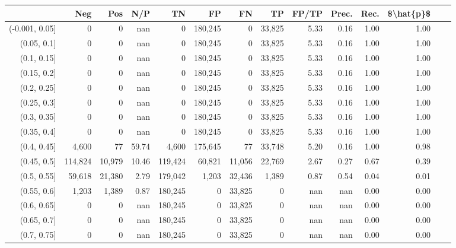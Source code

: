 \begin{tabular}{rrrrrrrrrrrrrr}
\toprule
{} &      Neg &     Pos &    N/P &       TN &       FP &      FN &      TP & FP/TP & Prec. &  Rec. & \$\textbackslash hat\{p\}\$ \\
\midrule
(-0.001, 0.05] &        0 &       0 &    nan &        0 &  180,245 &       0 &  33,825 &  5.33 &  0.16 &  1.00 &      1.00 \\
(0.05, 0.1]    &        0 &       0 &    nan &        0 &  180,245 &       0 &  33,825 &  5.33 &  0.16 &  1.00 &      1.00 \\
(0.1, 0.15]    &        0 &       0 &    nan &        0 &  180,245 &       0 &  33,825 &  5.33 &  0.16 &  1.00 &      1.00 \\
(0.15, 0.2]    &        0 &       0 &    nan &        0 &  180,245 &       0 &  33,825 &  5.33 &  0.16 &  1.00 &      1.00 \\
(0.2, 0.25]    &        0 &       0 &    nan &        0 &  180,245 &       0 &  33,825 &  5.33 &  0.16 &  1.00 &      1.00 \\
(0.25, 0.3]    &        0 &       0 &    nan &        0 &  180,245 &       0 &  33,825 &  5.33 &  0.16 &  1.00 &      1.00 \\
(0.3, 0.35]    &        0 &       0 &    nan &        0 &  180,245 &       0 &  33,825 &  5.33 &  0.16 &  1.00 &      1.00 \\
(0.35, 0.4]    &        0 &       0 &    nan &        0 &  180,245 &       0 &  33,825 &  5.33 &  0.16 &  1.00 &      1.00 \\
(0.4, 0.45]    &    4,600 &      77 &  59.74 &    4,600 &  175,645 &      77 &  33,748 &  5.20 &  0.16 &  1.00 &      0.98 \\
(0.45, 0.5]    &  114,824 &  10,979 &  10.46 &  119,424 &   60,821 &  11,056 &  22,769 &  2.67 &  0.27 &  0.67 &      0.39 \\
(0.5, 0.55]    &   59,618 &  21,380 &   2.79 &  179,042 &    1,203 &  32,436 &   1,389 &  0.87 &  0.54 &  0.04 &      0.01 \\
(0.55, 0.6]    &    1,203 &   1,389 &   0.87 &  180,245 &        0 &  33,825 &       0 &   nan &   nan &  0.00 &      0.00 \\
(0.6, 0.65]    &        0 &       0 &    nan &  180,245 &        0 &  33,825 &       0 &   nan &   nan &  0.00 &      0.00 \\
(0.65, 0.7]    &        0 &       0 &    nan &  180,245 &        0 &  33,825 &       0 &   nan &   nan &  0.00 &      0.00 \\
(0.7, 0.75]    &        0 &       0 &    nan &  180,245 &        0 &  33,825 &       0 &   nan &   nan &  0.00 &      0.00 \\

\end{tabular}
